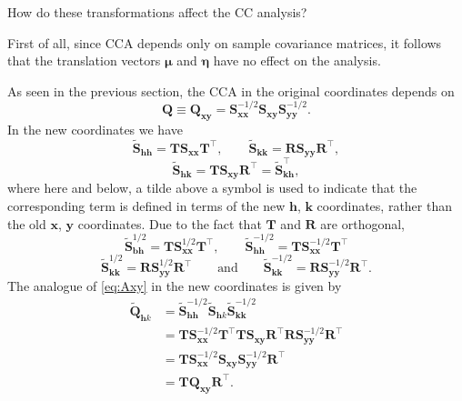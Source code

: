 \documentclass[]{book}
\theoremstyle{definition}
\theoremstyle{definition}
\theoremstyle{definition}
\theoremstyle{remark}
\begin{document}
How do these transformations affect the CC analysis?

First of all, since CCA depends only on sample covariance matrices, it follows that the translation vectors \(\pmb \mu\) and \(\pmb \eta\) have no effect on the analysis.

As seen in the previous section, the CCA in the original coordinates depends on
\begin{equation}
\boldsymbol Q\equiv \boldsymbol Q_{\boldsymbol x\boldsymbol y}=\boldsymbol S_{\boldsymbol x\boldsymbol x}^{-1/2}\boldsymbol S_{\boldsymbol x\boldsymbol y}\boldsymbol S_{\boldsymbol y\boldsymbol y}^{-1/2}.
\label{eq:Axy}
\end{equation}
In the new coordinates we have
\[
\tilde{\boldsymbol S}_{\boldsymbol h\boldsymbol h}={\mathbf T} \boldsymbol S_{\boldsymbol x\boldsymbol x}{\mathbf T}^\top, \qquad \tilde{\boldsymbol S}_{\boldsymbol k\boldsymbol k}={\mathbf R}\boldsymbol S_{\boldsymbol y\boldsymbol y}{\mathbf R}^\top,
\]
\[
\tilde{\boldsymbol S}_{\boldsymbol h\boldsymbol k}={\mathbf T}\boldsymbol S_{\boldsymbol x\boldsymbol y}{\mathbf R}^\top =
\tilde{\boldsymbol S}_{\boldsymbol k\boldsymbol h}^\top,
\]
where here and below, a tilde above a symbol is used to indicate that the corresponding term is defined in terms of the new \(\boldsymbol h\), \(\boldsymbol k\) coordinates, rather
than the old \(\boldsymbol x\), \(\boldsymbol y\) coordinates.
Due to the fact that \(\mathbf T\) and \(\mathbf R\) are orthogonal,
\[
\tilde{\boldsymbol S}_{\boldsymbol b\boldsymbol h}^{ 1/2}={\mathbf T}\boldsymbol S_{\boldsymbol x\boldsymbol x}^{ 1/2}{\mathbf T}^\top, \qquad
\tilde{\boldsymbol S}_{\boldsymbol h\boldsymbol h}^{ -1/2}={\mathbf T}\boldsymbol S_{\boldsymbol x\boldsymbol x}^{ -1/2}{\mathbf T}^\top
\]
\[
\tilde{\boldsymbol S}_{\boldsymbol k\boldsymbol k}^{ 1/2}={\mathbf R}\boldsymbol S_{\boldsymbol y\boldsymbol y}^{ 1/2}{\mathbf R}^\top \qquad \text{and} \qquad
\tilde{\boldsymbol S}_{\boldsymbol k\boldsymbol k}^{ -1/2}={\mathbf R}\boldsymbol S_{\boldsymbol y\boldsymbol y}^{- 1/2}{\mathbf R}^\top.
\]
The analogue of \eqref{eq:Axy} in the new coordinates is given by
\begin{align*}
\tilde{\boldsymbol Q}_{\mathbf h k}&=\tilde{\boldsymbol S}_{\boldsymbol h\boldsymbol h}^{-1/2}\tilde{\boldsymbol S}_{\mathbf h k}\tilde{\boldsymbol S}_{\boldsymbol k\boldsymbol k}^{-1/2}\\
&={\mathbf T} \boldsymbol S_{\boldsymbol x\boldsymbol x}^{-1/2}{\mathbf T}^\top {\mathbf T}\boldsymbol S_{\boldsymbol x\boldsymbol y}{\mathbf R}^\top {\mathbf R}\boldsymbol S_{\boldsymbol y\boldsymbol y}^{-1/2}{\mathbf R}^\top\\
&={\mathbf T}\boldsymbol S_{\boldsymbol x\boldsymbol x}^{-1/2}\boldsymbol S_{\boldsymbol x\boldsymbol y}\boldsymbol S_{\boldsymbol y\boldsymbol y}^{-1/2}{\mathbf R}^\top\\
&={\mathbf T} \boldsymbol Q_{\boldsymbol x\boldsymbol y}{\mathbf R}^\top.
\end{align*}
\end{document}
